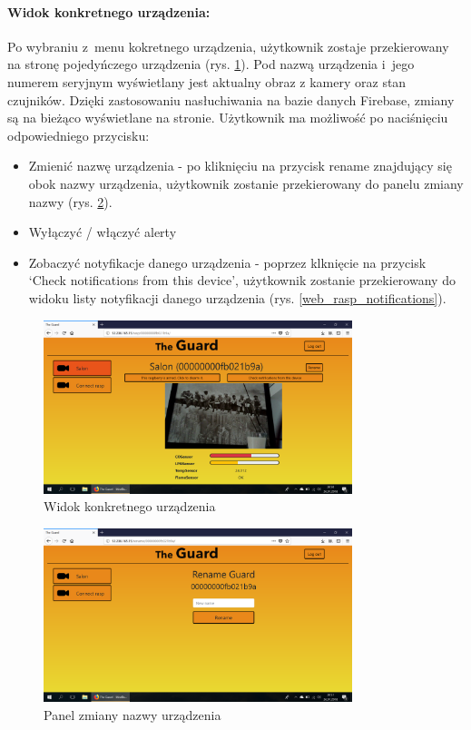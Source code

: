 \paragraph{Widok konkretnego urządzenia:} Po wybraniu z~menu kokretnego urządzenia, użytkownik zostaje przekierowany na stronę pojedyńczego urządzenia (rys. \ref{web_rasp_view}). Pod nazwą urządzenia i~jego numerem seryjnym wyświetlany jest aktualny obraz z kamery oraz stan czujników. Dzięki zastosowaniu nasłuchiwania na bazie danych Firebase, zmiany są na bieżąco wyświetlane na stronie. Użytkownik ma możliwość po naciśnięciu odpowiedniego przycisku:
\begin{itemize}
\item Zmienić nazwę urządzenia - po kliknięciu na przycisk rename znajdujący się obok nazwy urządzenia, użytkownik zostanie przekierowany do panelu zmiany nazwy (rys. \ref{web_rasp_rename}).
\item Wyłączyć / włączyć alerty 
\item Zobaczyć notyfikacje danego urządzenia - poprzez klknięcie na przycisk `Check notifications from this device', użytkownik zostanie przekierowany do widoku listy notyfikacji danego urządzenia (rys. \ref{web_rasp_notifications}).
\end{itemize}
\begin{figure}[ht]
	\centering
	\includegraphics[width=9cm]{web_screenshots/rasp_view.png}
	\caption{Widok konkretnego urządzenia}
	\label{web_rasp_view}
\end{figure}
\begin{figure}[ht]
	\centering
	\includegraphics[width=9cm]{web_screenshots/rasp_rename.png}
	\caption{Panel zmiany nazwy urządzenia}
	\label{web_rasp_rename}
\end{figure}
